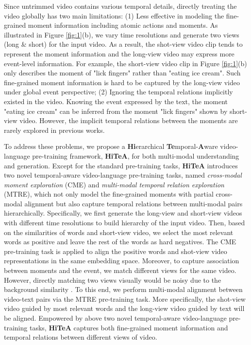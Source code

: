 \documentclass[10pt,twocolumn,letterpaper]{article}
\newcommand{\modelname}{\textbf{HiTeA}\xspace}
\begin{document}
Since untrimmed video contains various temporal details, directly treating the video globally has two main limitations: (1) Less effective in modeling the fine-grained moment information including atomic actions and moments. As illustrated in Figure \ref{fig:1}(b), we vary time resolutions and generate two views (long \& short) for the input video. As a result, the shot-view video clip tends to represent the moment information and the long-view video may express more event-level information. For example, the short-view video clip in Figure \ref{fig:1}(b) only describes the moment of "lick fingers" rather than "eating ice cream". Such fine-grained moment information is hard to be captured by the long-view video under global event perspective; (2) Ignoring the temporal relations implicitly existed in the video. Knowing the event expressed by the text, the moment "eating ice cream" can be inferred from the moment "lick fingers" shown by short-view video. However, the implicit temporal relations between the moments are rarely explored in previous works.


To address these problems, we propose a  \textbf{Hi}erarchical \textbf{Te}mporal-\textbf{A}ware video-language pre-training framework, \modelname, for both multi-modal understanding and generation. 
Except for the standard pre-training tasks, \modelname introduces two novel temporal-aware video-language pre-training tasks, named \textit{cross-modal moment exploration} (CME) and \textit{multi-modal temporal relation exploration} (MTRE), 
which not only model the fine-grained moments with partial cross-modal alignment but also capture temporal relations between multi-modal pairs hierarchically.
Specifically, we first generate the long-view and short-view videos with different time resolutions to build hierarchy of the input video. Then, based on the similarities of words and short-view video, we select the most relevant words as positive and leave the rest of the words as hard negatives. The CME pre-training task is applied to align the positive words and shot-view video representations in the same embedding space.
Moreover, to capture association between moments and the event, we match different views for the same video. However, directly matching two views visually would be noisy due to the background similarity \cite{roth2022languagemetric}. 
To this end, we perform multi-modal alignment between video-text pairs via the MTRE pre-training task.
More specifically, the shot-view video guided by most relevant words and the long-view video guided by text will be aligned. 
Empowered by above two novel temporal-aware video-language pre-training tasks, \modelname captures both fine-grained moment information and temporal relations between different views of video.
 
\end{document}
